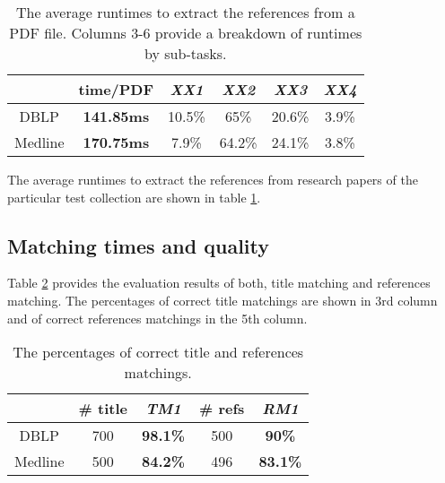 \begin{table}[ht]
\centering
{\renewcommand{\baselinestretch}{1.3}\normalsize
\hspace*{-2.5mm}
\begin{tabular}{|c|c|cccc|} \hline
& \textbf{time/PDF} &  \textit{XX1} & \textit{XX2} & \textit{XX3} & \textit{XX4} \\ \hline
DBLP    & \textbf{141.85ms} & 10.5\% & 65\% & 20.6\% & 3.9\% \\
Medline & \textbf{170.75ms} & 7.9\% & 64.2\% & 24.1\% & 3.8\% \\ \hline
\end{tabular}}
\vspace{-3mm}
\caption{The average runtimes to extract the references from a PDF file. Columns 3-6 provide a breakdown of runtimes by sub-tasks.}
\label{table:references-extraction-runtimes}
\vspace{-2mm}
\end{table}

The average runtimes to extract the references from research papers of the particular test collection are shown in table \ref{table:references-extraction-runtimes}.

\subsection{Matching times and quality}\label{sec:experiments_matching}

Table \ref{table:matching-quality} provides the evaluation results of both, title matching and references matching. The percentages of correct title matchings are shown in 3rd column and of correct references matchings in the 5th column.

\vspace{-1mm}
\begin{table}[ht]
\centering
{\renewcommand{\baselinestretch}{1.3}\normalsize
\hspace*{-2.5mm}
\begin{tabular}{|c|c|c||c|c|} \hline
& \# title & \textit{\textbf{TM1}} & \# refs  & \textit{\textbf{RM1}} \\ \hline
DBLP    & 700 & \textbf{98.1\%} & 500 & \textbf{90\%} \\
Medline & 500 & \textbf{84.2\%} & 496 & \textbf{83.1\%} \\ \hline
\end{tabular}}
\vspace{-3mm}
\caption{The percentages of correct title and references matchings.}
\label{table:matching-quality}
\vspace{-2mm}
\end{table}

